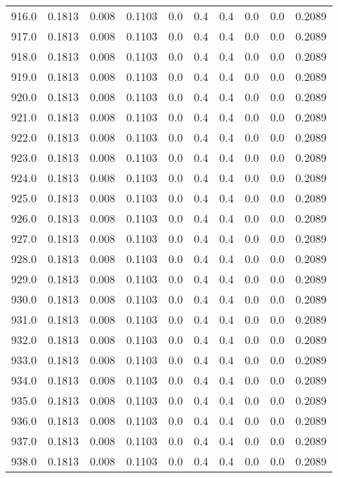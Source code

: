 \begin{longtable}{lrrrrrrrrr}
916.0 & 0.1813 & 0.008 & 0.1103 & 0.0 & 0.4 & 0.4 & 0.0 & 0.0 & 0.2089 \\
917.0 & 0.1813 & 0.008 & 0.1103 & 0.0 & 0.4 & 0.4 & 0.0 & 0.0 & 0.2089 \\
918.0 & 0.1813 & 0.008 & 0.1103 & 0.0 & 0.4 & 0.4 & 0.0 & 0.0 & 0.2089 \\
919.0 & 0.1813 & 0.008 & 0.1103 & 0.0 & 0.4 & 0.4 & 0.0 & 0.0 & 0.2089 \\
920.0 & 0.1813 & 0.008 & 0.1103 & 0.0 & 0.4 & 0.4 & 0.0 & 0.0 & 0.2089 \\
921.0 & 0.1813 & 0.008 & 0.1103 & 0.0 & 0.4 & 0.4 & 0.0 & 0.0 & 0.2089 \\
922.0 & 0.1813 & 0.008 & 0.1103 & 0.0 & 0.4 & 0.4 & 0.0 & 0.0 & 0.2089 \\
923.0 & 0.1813 & 0.008 & 0.1103 & 0.0 & 0.4 & 0.4 & 0.0 & 0.0 & 0.2089 \\
924.0 & 0.1813 & 0.008 & 0.1103 & 0.0 & 0.4 & 0.4 & 0.0 & 0.0 & 0.2089 \\
925.0 & 0.1813 & 0.008 & 0.1103 & 0.0 & 0.4 & 0.4 & 0.0 & 0.0 & 0.2089 \\
926.0 & 0.1813 & 0.008 & 0.1103 & 0.0 & 0.4 & 0.4 & 0.0 & 0.0 & 0.2089 \\
927.0 & 0.1813 & 0.008 & 0.1103 & 0.0 & 0.4 & 0.4 & 0.0 & 0.0 & 0.2089 \\
928.0 & 0.1813 & 0.008 & 0.1103 & 0.0 & 0.4 & 0.4 & 0.0 & 0.0 & 0.2089 \\
929.0 & 0.1813 & 0.008 & 0.1103 & 0.0 & 0.4 & 0.4 & 0.0 & 0.0 & 0.2089 \\
930.0 & 0.1813 & 0.008 & 0.1103 & 0.0 & 0.4 & 0.4 & 0.0 & 0.0 & 0.2089 \\
931.0 & 0.1813 & 0.008 & 0.1103 & 0.0 & 0.4 & 0.4 & 0.0 & 0.0 & 0.2089 \\
932.0 & 0.1813 & 0.008 & 0.1103 & 0.0 & 0.4 & 0.4 & 0.0 & 0.0 & 0.2089 \\
933.0 & 0.1813 & 0.008 & 0.1103 & 0.0 & 0.4 & 0.4 & 0.0 & 0.0 & 0.2089 \\
934.0 & 0.1813 & 0.008 & 0.1103 & 0.0 & 0.4 & 0.4 & 0.0 & 0.0 & 0.2089 \\
935.0 & 0.1813 & 0.008 & 0.1103 & 0.0 & 0.4 & 0.4 & 0.0 & 0.0 & 0.2089 \\
936.0 & 0.1813 & 0.008 & 0.1103 & 0.0 & 0.4 & 0.4 & 0.0 & 0.0 & 0.2089 \\
937.0 & 0.1813 & 0.008 & 0.1103 & 0.0 & 0.4 & 0.4 & 0.0 & 0.0 & 0.2089 \\
938.0 & 0.1813 & 0.008 & 0.1103 & 0.0 & 0.4 & 0.4 & 0.0 & 0.0 & 0.2089 \\

\end{longtable}
